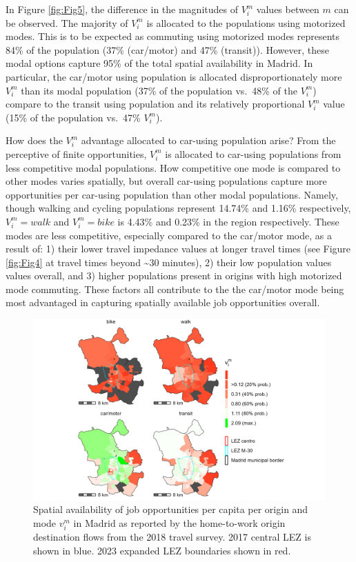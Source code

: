 \documentclass[numbered]{trbunofficial}
\begin{document}
In Figure \ref{fig:Fig5}, the difference in the magnitudes of \(V_i^m\)
values between \(m\) can be observed. The majority of \(V_i^m\) is
allocated to the populations using motorized modes. This is to be
expected as commuting using motorized modes represents 84\% of the
population (37\% (car/motor) and 47\% (transit)). However, these modal
options capture 95\% of the total spatial availability in Madrid. In
particular, the car/motor using population is allocated
disproportionately more \(V_i^m\) than its modal population (37\% of the
population vs.~48\% of the \(V_i^m\)) compare to the transit using
population and its relatively proportional \(V_i^m\) value (15\% of the
population vs.~47\% \(V_i^m\)).

How does the \(V_i^m\) advantage allocated to car-using population
arise? From the perceptive of finite opportunities, \(V_i^m\) is
allocated to car-using populations from less competitive modal
populations. How competitive one mode is compared to other modes varies
spatially, but overall car-using populations capture more opportunities
per car-using population than other modal populations. Namely, though
walking and cycling populations represent 14.74\% and 1.16\%
respectively, \(V_i^m={walk}\) and \(V_i^m={bike}\) is 4.43\% and 0.23\%
in the region respectively. These modes are less competitive, especially
compared to the car/motor mode, as a result of: 1) their lower travel
impedance values at longer travel times (see Figure \ref{fig:Fig4} at
travel times beyond \textasciitilde30 minutes), 2) their low population
values values overall, and 3) higher populations present in origins with
high motorized mode commuting. These factors all contribute to the the
car/motor mode being most advantaged in capturing spatially available
job opportunities overall.

\begin{figure}

{\centering \includegraphics[width=1\linewidth]{images/SA_im_vv_zn208_plot} 

}

\caption{\label{fig:Fig6} Spatial availability of job opportunities per capita per origin and mode $v_i^m$ in Madrid as reported by the home-to-work origin destination flows from the 2018 travel survey. 2017 central LEZ is shown in blue. 2023 expanded LEZ boundaries shown in red.}\label{fig:SA-per-capita-m-plot}
\end{figure}
\end{document}
